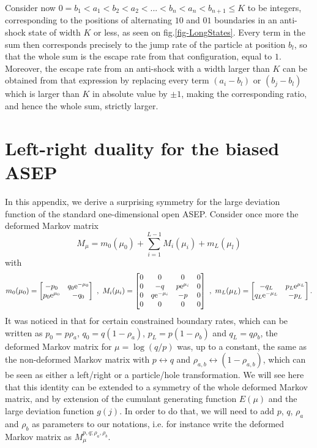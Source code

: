 \documentclass[aps,pre,onecolumn,showpacs,showkeys,a4paper]{revtex4-1}
\begin{document}
Consider now $0=b_1<a_1<b_2<a_2<...<b_n<a_n<b_{n+1}\leq K$ to be integers, corresponding to the positions of alternating $10$ and $01$ boundaries in an anti-shock state of width $K$ or less, as seen on fig.\ref{fig-LongStates}. Every term in the sum then corresponds precisely to the jump rate of the particle at position $b_l$, so that the whole sum is the escape rate from that configuration, equal to $1$. Moreover, the escape rate from an anti-shock with a width larger than $K$ can be obtained from that expression by replacing every term $(a_i-b_l)$ or $(b_j-b_l)$ which is larger than $K$ in absolute value by $\pm1$, making the corresponding ratio, and hence the whole sum, strictly larger.


\section{Left-right duality for the biased ASEP}
\label{A3}

In this appendix, we derive a surprising symmetry for the large deviation function of the standard one-dimensional open ASEP. Consider once more the deformed Markov matrix
\begin{equation}
M_{\mu}=m_0(\mu_0)+\sum_{i=1}^{L-1} M_{i}(\mu_i)+m_L(\mu_l)
\end{equation}
with
\begin{equation}
m_0(\mu_0)=\begin{bmatrix} -p_0 & q_0{\rm e}^{-\mu_0} \\ p_0{\rm e}^{\mu_0} & -q_0  \end{bmatrix}~,~ M_{i}(\mu_i)=\begin{bmatrix} 0 & 0 & 0 & 0 \\ 0 & -q & p{\rm e}^{\mu_i} & 0 \\ 0 & q{\rm e}^{-\mu_i}& -p & 0 \\ 0 & 0 & 0 & 0 \end{bmatrix}~,~m_L(\mu_L)=\begin{bmatrix} -q_L & p_L{\rm e}^{\mu_L} \\  q_L{\rm e}^{-\mu_L} & -p_L  \end{bmatrix}.
\end{equation}
It was noticed in \cite{Torkaman2015} that for certain constrained boundary rates, which can be written as $p_0=p\rho_a $, $q_0=q(1-\rho_a)$, $p_L=p(1-\rho_b)$ and $q_L=q\rho_b $, the deformed Markov matrix for $\mu=\log(q/p)$ was, up to a constant, the same as the non-deformed Markov matrix with $p\leftrightarrow q$ and $\rho_{a,b}\leftrightarrow(1-\rho_{a,b})$, which can be seen as either a left/right or a particle/hole transformation. We will see here that this identity can be extended to a symmetry of the whole deformed Markov matrix, and by extension of the cumulant generating function $E(\mu)$ and the large deviation function $g(j)$. In order to do that, we will need to add $p$, $q$, $\rho_a$ and $\rho_b$ as parameters to our notations, i.e. for instance write the deformed Markov matrix as $M_{\mu}^{p,q;\rho_a,\rho_b}$.
\end{document}
